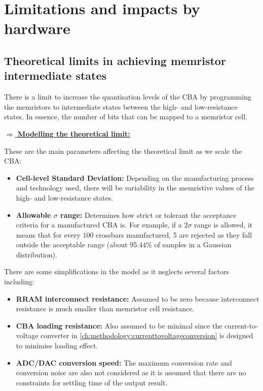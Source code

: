 \section{Limitations and impacts by hardware}

\subsection{Theoretical limits in achieving memristor intermediate states}

\noindent
There is a limit to increase the quantisation levels of the \ac{CBA} by programming the memristors to intermediate states between the high- and low-resistance states. In essence, the number of bits that can be mapped to a memristor cell.

\vspace{0.5em}

\noindent\underline{\textbf{$\Rightarrow$ Modelling the theoretical limit:}}
\vspace{0.2em}

\noindent
These are the main parameters affecting the theoretical limit as we scale the \ac{CBA}:

\begin{itemize}
    \item \textbf{Cell-level Standard Deviation:} Depending on the manufacturing process and technology used, there will be variability in the memristive values of the high- and low-resistance states. 
    \item \textbf{Allowable $\sigma$ range:} Determines how strict or tolerant the acceptance criteria for a manufactured \ac{CBA} is. For example, if a $2\sigma$ range is allowed, it means that for every 100 crossbars manufactured, 5 are rejected as they fall outside the acceptable range (about 95.44\% of samples in a Gaussian distribution).
\end{itemize}

\noindent
There are some simplifications in the model as it neglects several factors including:

\begin{itemize}
    \item \textbf{RRAM interconnect resistance:} Assumed to be zero because interconnect resistance is much smaller than memristor cell resistance.
    
    \item \textbf{\Ac{CBA} loading resistance:} Also assumed to be minimal since the current-to-voltage converter in \autoref{ch:methodology:currenttovoltageconversion} is designed to minimise loading effect.

    \item \textbf{ADC/DAC conversion speed:} The maximum conversion rate and conversion noise are also not considered as it is assumed that there are no constraints for settling time of the output result.
\end{itemize}

